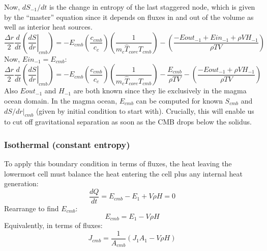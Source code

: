 Now, $dS_{-1}/dt$ is the change in entropy of the last staggered node, which is given by the ``master'' equation since it depends on fluxes in and out of the volume as well as interior heat sources.
\begin{equation}
\frac{\Delta r}{2} \frac{d}{dt} \left( \left. \frac{dS}{dr} \right |_{cmb} \right) = -E_{cmb} \left( \frac{c_{cmb}}{c_c} \right) \left( \frac{1}{m_c \hat{T}_{core} T_{cmb}} \right) - \left( \frac{-Eout_{-1}+Ein_{-1}+\rho V H_{-1}}{\rho T V} \right)
\end{equation}
Now, $Ein_{-1}=E_{cmb}$:
\begin{equation}
\frac{\Delta r}{2} \frac{d}{dt} \left( \left. \frac{dS}{dr} \right |_{cmb} \right) = -E_{cmb} \left( \frac{c_{cmb}}{c_c} \right) \left( \frac{1}{m_c \hat{T}_{core} T_{cmb}} \right) - \frac{E_{cmb}}{\rho T V} - \left( \frac{-Eout_{-1}+\rho V H_{-1}}{\rho T V} \right)
\end{equation}
Also $Eout_{-1}$ and $H_{-1}$ are both known since they lie exclusively in the magma ocean domain.  In the magma ocean, $E_{cmb}$ can be computed for known $S_{cmb}$ and $dS/dr|_{cmb}$ (given by initial condition to start with).  Crucially, this will enable us to cut off gravitational separation as soon as the CMB drops below the solidus.
\subsubsection{Isothermal (constant entropy)}
To apply this boundary condition in terms of fluxes, the heat leaving the lowermost cell must balance the heat entering the cell plus any internal heat generation:
\begin{equation}
\frac{dQ}{dt} = E_{cmb} - E_1 + V \rho H = 0
\end{equation}
Rearrange to find $E_{cmb}$:
\begin{equation}
E_{cmb} = E_1 - V \rho H
\end{equation}
Equivalently, in terms of fluxes:
\begin{equation}
J_{cmb} = \frac{1}{A_{cmb}} \left( J_1A_1 - V \rho H \right)
\end{equation}